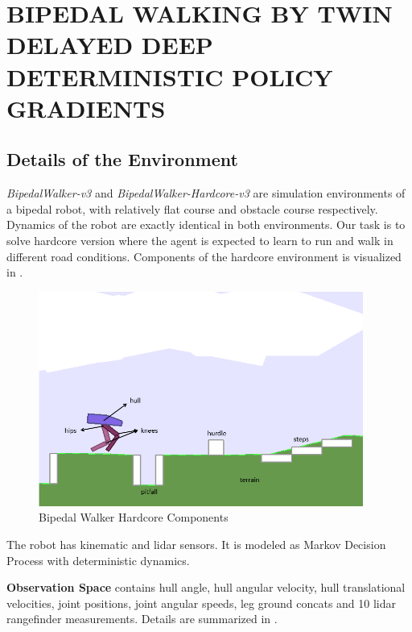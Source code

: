 \chapter{BIPEDAL WALKING BY TWIN DELAYED DEEP DETERMINISTIC POLICY GRADIENTS}
\label{chap:exp_setup}

\section{Details of the Environment}

\textit{BipedalWalker-v3} and \textit{BipedalWalker-Hardcore-v3} are simulation environments of a bipedal robot, 
with relatively flat course and obstacle course respectively. 
Dynamics of the robot are exactly identical in both environments. 
Our task is to solve hardcore version where the agent is expected to learn to run and walk in different road conditions. 
Components of the hardcore environment is visualized in . 

\begin{figure}
	\centering
	\includegraphics[width=0.95\textwidth]{figures/bipedal/bpedal_annotated.png}
	\caption{Bipedal Walker Hardcore Components~\cite{noauthor_bipedalwalkerhardcore-v2_2021}}
	\label{fig:bipedal_hardcore_components}
\end{figure}

The robot has kinematic and lidar sensors. 
It is modeled as Markov Decision Process with deterministic dynamics. 

\textbf{Observation Space} contains hull angle, hull angular velocity, hull translational velocities, joint positions, joint angular speeds, leg ground concats and 10 lidar rangefinder measurements. Details are summarized in . 

